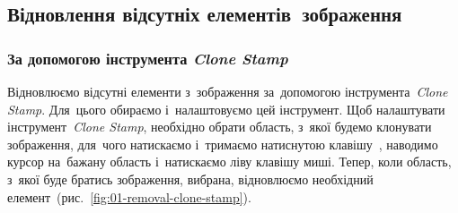 \documentclass[
	a4paper,
	oneside,
	BCOR = 10mm,
	DIV = 12,
	12pt,
	headings = normal,
]{scrartcl}
\begin{document}
		\subsection{Відновлення відсутніх елементів~зображення}
			\subsubsection{За допомогою інструмента \emph{\textenglish{Clone Stamp}}}
				Відновлюємо відсутні елементи з~зображення за~допомогою інструмента~\emph{\textenglish{Clone Stamp}}. Для~цього обираємо і~налаштовуємо цей інструмент. Щоб налаштувати інструмент~\emph{\textenglish{Clone Stamp}}, необхідно обрати область, з~якої будемо клонувати зображення, для~чого натискаємо і~тримаємо натиснутою клавішу~, наводимо курсор на~бажану область і~натискаємо ліву клавішу миші. Тепер, коли область, з~якої буде братись зображення, вибрана, відновлюємо необхідний елемент~(рис.~\ref{fig:01-removal-clone-stamp}).
\end{document}
